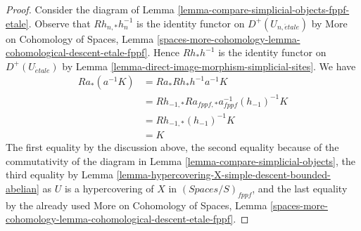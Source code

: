 \documentclass{stacks-project}
\theoremstyle{plain}
\theoremstyle{definition}
\theoremstyle{remark}
\numberwithin{equation}{subsection}
\def\etale{{\acute{e}tale}}
\begin{document}
\begin{proof}
Consider the diagram of Lemma \ref{lemma-compare-simplicial-objects-fppf-etale}.
Observe that $Rh_{n, *}h_n^{-1}$ is the identity functor
on $D^+(U_{n, \etale})$ by
More on Cohomology of Spaces, Lemma
\ref{spaces-more-cohomology-lemma-cohomological-descent-etale-fppf}.
Hence $Rh_*h^{-1}$ is the identity functor on
$D^+(U_\etale)$ by
Lemma \ref{lemma-direct-image-morphism-simplicial-sites}.
We have
\begin{align*}
Ra_*(a^{-1}K)
& =
Ra_*Rh_*h^{-1}a^{-1}K \\
& =
Rh_{-1, *}Ra_{fppf, *}a_{fppf}^{-1}(h_{-1})^{-1}K \\
& =
Rh_{-1, *}(h_{-1})^{-1}K \\
& =
K
\end{align*}
The first equality by the discussion above, the second equality
because of the commutativity of the diagram in
Lemma \ref{lemma-compare-simplicial-objects}, the third equality by
Lemma \ref{lemma-hypercovering-X-simple-descent-bounded-abelian}
as $U$ is a hypercovering of $X$ in $(\textit{Spaces}/S)_{fppf}$,
and the last equality by the already used
More on Cohomology of Spaces, Lemma
\ref{spaces-more-cohomology-lemma-cohomological-descent-etale-fppf}.
\end{proof}
\end{document}
